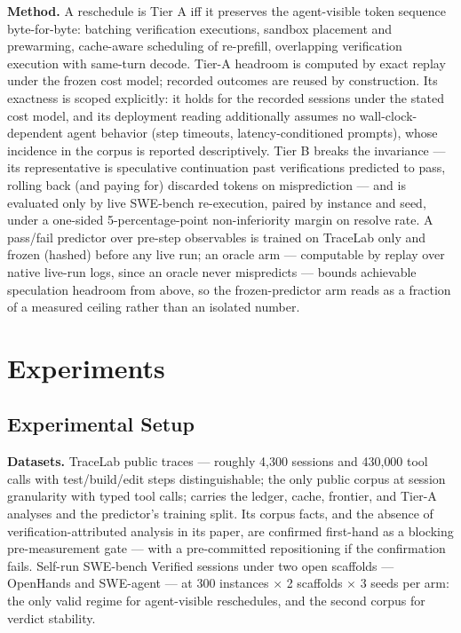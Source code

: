 \documentclass[11pt]{article}
\begin{document}
\textbf{Method.} A reschedule is Tier A iff it preserves the agent-visible token sequence byte-for-byte: batching verification executions, sandbox placement and prewarming, cache-aware scheduling of re-prefill, overlapping verification execution with same-turn decode. Tier-A headroom is computed by exact replay under the frozen cost model; recorded outcomes are reused by construction. Its exactness is scoped explicitly: it holds for the recorded sessions under the stated cost model, and its deployment reading additionally assumes no wall-clock-dependent agent behavior (step timeouts, latency-conditioned prompts), whose incidence in the corpus is reported descriptively. Tier B breaks the invariance --- its representative is speculative continuation past verifications predicted to pass, rolling back (and paying for) discarded tokens on misprediction --- and is evaluated only by live SWE-bench re-execution, paired by instance and seed, under a one-sided 5-percentage-point non-inferiority margin on resolve rate. A pass/fail predictor over pre-step observables is trained on TraceLab only and frozen (hashed) before any live run; an oracle arm --- computable by replay over native live-run logs, since an oracle never mispredicts --- bounds achievable speculation headroom from above, so the frozen-predictor arm reads as a fraction of a measured ceiling rather than an isolated number.

\section{Experiments}

\subsection{Experimental Setup}

\textbf{Datasets.} TraceLab public traces \citep{TraceLab2606} --- roughly 4{,}300 sessions and 430{,}000 tool calls with test/build/edit steps distinguishable; the only public corpus at session granularity with typed tool calls; carries the ledger, cache, frontier, and Tier-A analyses and the predictor's training split. Its corpus facts, and the absence of verification-attributed analysis in its paper, are confirmed first-hand as a blocking pre-measurement gate --- with a pre-committed repositioning if the confirmation fails. Self-run SWE-bench Verified sessions \citep{Jimenez2024SWEbench} under two open scaffolds --- OpenHands \citep{Wang2024OpenHands} and SWE-agent \citep{Yang2024SWEagent} --- at 300 instances $\times$ 2 scaffolds $\times$ 3 seeds per arm: the only valid regime for agent-visible reschedules, and the second corpus for verdict stability.
\end{document}
